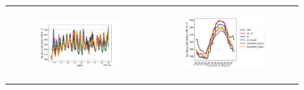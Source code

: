 \begin{figure}[hbtp]
\begin{tabular}{cc}
        \begin{subfigure}[t]{0.5\textwidth}
            \caption{}
            \includegraphics[width=\textwidth]{images/chap5/SOP_TS_DC/time_series_cendrosa_LWdnSFC.png}
        \end{subfigure} &
        \begin{subfigure}[t]{0.5\textwidth}
            \caption{}
            \includegraphics[width=\textwidth]{images/chap5/SOP_TS_DC/diurnal_cycle_cendrosa_LWdnSFC.png}
        \end{subfigure} \\


\end{tabular}
\end{figure}
